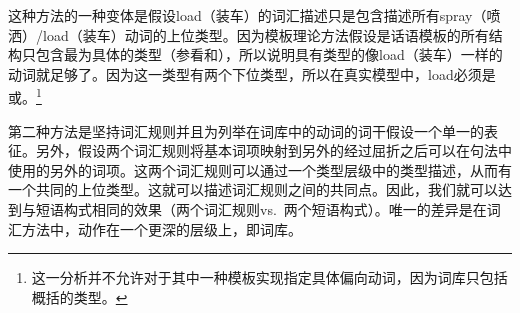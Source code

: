 \begin{exe}
\begin{xlist}[iv.]
\begin{exe}
\begin{xlist}[iv.]
这种方法的一种变体是假设load（装车）的词汇描述只是包含描述所有spray（喷洒）/load（装车）动词的上位类型。因为模板理论方法假设是话语模板的所有结构只包含最为具体的类型（参看和），所以说明具有类型的像load（装车）一样的动词就足够了。因为这一类型有两个下位类型，所以在真实模型中，load必须是或。\footnote{%
	这一分析并不允许对于其中一种模板实现指定具体偏向动词，因为词库只包括概括的类型。
}

第二种方法是坚持词汇规则并且为列举在词库中的动词的词干假设一个单一的表征。另外，假设两个词汇规则将基本词项映射到另外的经过屈折之后可以在句法中使用的另外的词项。这两个词汇规则可以通过一个类型层级中的类型描述，从而有一个共同的上位类型。这就可以描述词汇规则之间的共同点。因此，我们就可以达到与短语构式相同的效果（两个词汇规则vs.\ 两个短语构式）。唯一的差异是在词汇方法中，动作在一个更深的层级上，即词库\citep[--406]{Mueller2002b}。


\end{xlist}
\end{exe}
\end{xlist}
\end{exe}
